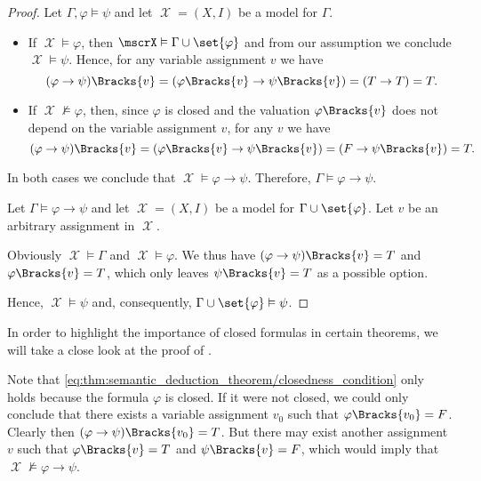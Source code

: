 \begin{proof}
  \SufficiencySubProof Let \( \Gamma, \varphi \vDash \psi \) and let \( \mscrX = (X, I) \) be a model for \( \Gamma \).

  \begin{itemize}
    \item If \( \mscrX \vDash \varphi \), then \( \mscrX \vDash \Gamma \cup \set{ \varphi } \) and from our assumption we conclude \( \mscrX \vDash \psi \). Hence, for any variable assignment \( v \) we have
    \begin{equation*}
      (\varphi \rightarrow \psi)\Bracks{v}
      =
      (\varphi\Bracks{v} \rightarrow \psi\Bracks{v})
      =
      (T \rightarrow T)
      =
      T.
    \end{equation*}

    \item If \( \mscrX \not\vDash \varphi \), then, since \( \varphi \) is closed and the valuation \( \varphi\Bracks{v} \) does not depend on the variable assignment \( v \), for any \( v \) we have
    \begin{equation}\label{eq:thm:semantic_deduction_theorem/closedness_condition}
      (\varphi \rightarrow \psi)\Bracks{v}
      =
      (\varphi\Bracks{v} \rightarrow \psi\Bracks{v})
      =
      (F \rightarrow \psi\Bracks{v})
      =
      T.
    \end{equation}

  \end{itemize}

  In both cases we conclude that \( \mscrX \vDash \varphi \rightarrow \psi \). Therefore, \( \Gamma \vDash \varphi \rightarrow \psi \).

  \NecessitySubProof Let \( \Gamma \vDash \varphi \rightarrow \psi \) and let \( \mscrX = (X, I) \) be a model for \( \Gamma \cup \set{ \varphi } \). Let \( v \) be an arbitrary assignment in \( \mscrX \).

  Obviously \( \mscrX \vDash \Gamma \) and \( \mscrX \vDash \varphi \). We thus have \( (\varphi \rightarrow \psi)\Bracks{v} = T \) and \( \varphi\Bracks{v} = T \), which only leaves \( \psi\Bracks{v} = T \) as a possible option.

  Hence, \( \mscrX \vDash \psi \) and, consequently, \( \Gamma \cup \set{ \varphi } \vDash \psi \).
\end{proof}

\begin{remark}\label{rem:deduction_with_free_variables}
  In order to highlight the importance of closed formulas in certain theorems, we will take a close look at the proof of .

  Note that \eqref{eq:thm:semantic_deduction_theorem/closedness_condition} only holds because the formula \( \varphi \) is closed. If it were not closed, we could only conclude that there exists a variable assignment \( v_0 \) such that \( \varphi\Bracks{v_0} = F \). Clearly then \( (\varphi \rightarrow \psi)\Bracks{v_0} = T \). But there may exist another assignment \( v \) such that \( \varphi\Bracks{v} = T \) and \( \psi\Bracks{v} = F \), which would imply that \( \mscrX \not\vDash \varphi \rightarrow \psi \).
\end{remark}
